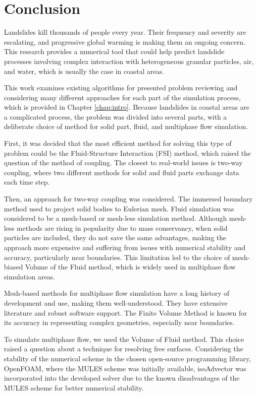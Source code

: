 \chapter{Conclusion} \label{chap:conclusion}
Landslides kill thousands of people every year. Their frequency and severity are escalating, and progressive global warming is making them an ongoing concern. This research provides a numerical tool that could help predict landslide processes involving complex interaction with heterogeneous granular particles, air, and water, which is usually the case in coastal areas. 

This work examines existing algorithms for presented problem reviewing and considering many different approaches for each part of the simulation process, which is provided in Chapter \ref{chap:intro}. Because landslides in coastal areas are a complicated process, the problem was divided into several parts, with a deliberate choice of method for solid part, fluid, and multiphase flow simulation.

First, it was decided that the most efficient method for solving this type of problem could be the Fluid-Structure Interaction (FSI) method, which raised the question of the method of coupling. The closest to real-world issues is two-way coupling, where two different methods for solid and fluid parts exchange data each time step.

Then, an approach for two-way coupling was considered. The immersed boundary method used to project solid bodies to Eulerian mesh. Fluid simulation was considered to be a mesh-based or mesh-less simulation method. Although mesh-less methods are rising in popularity due to mass conservancy, when solid particles are included, they do not save the same advantages, making the approach more expensive and suffering from issues with numerical stability and accuracy, particularly near boundaries. This limitation led to the choice of mesh-biased Volume of the Fluid method, which is widely used in multiphase flow simulation areas.

Mesh-based methods for multiphase flow simulation have a long history of development and use, making them well-understood. They have extensive literature and robust software support. The Finite Volume Method is known for its accuracy in representing complex geometries, especially near boundaries. 

To simulate multiphase flow, we used the Volume of Fluid method. This choice raised a question about a technique for resolving free surfaces. Considering the stability of the numerical scheme in the chosen open-source programming library, OpenFOAM, where the MULES scheme was initially available, isoAdvector was incorporated into the developed solver due to the known disadvantages of the MULES scheme for better numerical stability.


